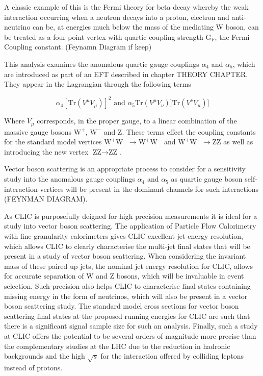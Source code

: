 A classic example of this is the Fermi theory for beta decay whereby the weak interaction occurring when a neutron decays into a proton, electron and anti-neutrino can be, at energies much below the mass of the mediating W boson, can be treated as a four-point vertex with quartic coupling strength $\text{G}_{F}$, the Fermi Coupling constant.  (Feynamn Diagram if keep)

This analysis examines the anomalous quartic gauge couplings $\alpha_{4}$ and $\alpha_{5}$, which are introduced as part of an EFT described in chapter THEORY CHAPTER.  They appear in the Lagrangian through the following terms  

\begin{equation}
\alpha_{4}[\text{Tr}(V^{\mu}V_{\mu})]^{2} \text{ and } \alpha_{5}\text{Tr}(V^{\mu}V_{\nu})] \text{Tr}(V^{\nu}V_{\mu})]
\end{equation}

Where $V_{\mu}$ corresponds, in the proper gauge, to a linear combination of the massive gauge bosons $\text{W}^{+}$, $\text{W}^{-}$ and Z.  These terms effect the coupling constants for the standard model vertices $\text{W}^{+}\text{W}^{-} \rightarrow \text{W}^{+}\text{W}^{-}$ and $\text{W}^{+}\text{W}^{-} \rightarrow \text{Z}\text{Z}$ as well as introducing the new vertex $\text{Z}\text{Z} \rightarrow \text{Z}\text{Z}$.  

Vector boson scattering is an appropriate process to consider for a sensitivity study into the anomalous gauge couplings $\alpha_{4}$ and $\alpha_{5}$ as quartic gauge boson self-interaction vertices will be present in the dominant channels for such interactions (FEYNMAN DIAGRAM). 

As CLIC is purposefully deigned for high precision measurements it is ideal for a study into vector boson scattering.  The application of Particle Flow Calorimetry with fine granularity calorimeters gives CLIC excellent jet energy resolution, which allows CLIC to clearly characterise the multi-jet final states that will be present in a study of vector boson scattering.  When considering the invariant mass of these paired up jets, the nominal jet energy resolution for CLIC, allows for accurate separation of W and Z bosons, which will be invaluable in event selection.  Such precision also helps CLIC to characterise final states containing missing energy in the form of neutrinos, which will also be present in a vector boson scattering study.  The standard model cross sections for vector boson scattering final states at the proposed running energies for CLIC are such that there is a significant signal sample size for such an analysis.  Finally, such a study at CLIC offers the potential to be several orders of magnitude more precise than the complementary studies at the LHC due to the reduction in hadronic backgrounds and the high $\sqrt{s}$ for the interaction offered by colliding leptons instead of protons.

